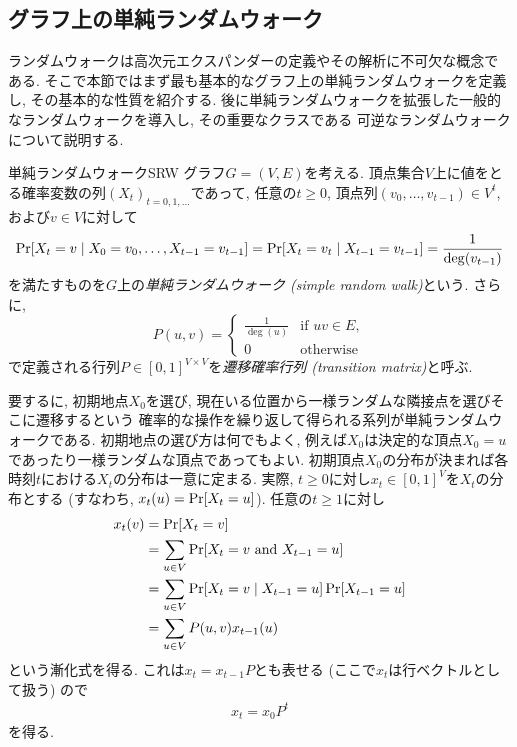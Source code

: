 \subsection{グラフ上の単純ランダムウォーク} \label{sec:SRW}
ランダムウォークは高次元エクスパンダーの定義やその解析に不可欠な概念である.
そこで本節ではまず最も基本的なグラフ上の単純ランダムウォークを定義し, その基本的な性質を紹介する.
後に単純ランダムウォークを拡張した一般的なランダムウォークを導入し, その重要なクラスである
可逆なランダムウォークについて説明する.
%
\begin{definition}{単純ランダムウォーク}{SRW}
  グラフ$G=(V,E)$を考える.
  頂点集合$V$上に値をとる確率変数の列$(X_t)_{t=0,1,\dots}$であって,
  任意の$t\ge 0$, 頂点列$(v_0,\dots,v_{t-1})\in V^t$, および$v\in V$に対して
  \[
    \Pr\sbra*{ X_t = v \condition X_0=v_0,\dots,X_{t-1} = v_{t-1} } = \Pr\sbra*{ X_t = v_t \condition X_{t-1} = v_{t-1}} = \frac{1}{\deg(v_{t-1})}
  \]
  を満たすものを$G$上の\emph{単純ランダムウォーク (simple random walk)}という.
  さらに,
  \[
    P(u,v) = \begin{cases}
      \frac{1}{\deg(u)}	& \text{if }uv\in E,\\
      0 & \text{otherwise}
    \end{cases}
  \]
  で定義される行列$P \in [0,1]^{V\times V}$を\emph{遷移確率行列 (transition matrix)}と呼ぶ.
\end{definition}
%
要するに, 初期地点$X_0$を選び, 現在いる位置から一様ランダムな隣接点を選びそこに遷移するという
確率的な操作を繰り返して得られる系列が単純ランダムウォークである.
初期地点の選び方は何でもよく,
例えば$X_0$は決定的な頂点$X_0=u$であったり一様ランダムな頂点であってもよい.
%
初期頂点$X_0$の分布が決まれば各時刻$t$における$X_t$の分布は一意に定まる.
実際, $t\ge 0$に対し$x_t \in [0,1]^{V}$を$X_t$の分布とする
  (すなわち, $x_t(u) = \Pr\sbra*{X_t = u}$).
任意の$t\ge 1$に対し
\begin{align*}
  x_t(v) &= \Pr\sbra*{X_t = v} \\
    &= \sum_{u\in V}\Pr\sbra*{ X_t = v \tand X_{t-1} = u} \\
    &= \sum_{u\in V}\Pr\sbra*{ X_t = v \condition X_{t-1} = u} \Pr\sbra*{X_{t-1} = u}  \\
    &= \sum_{u\in V} P(u,v) x_{t-1}(u)
\end{align*}
という漸化式を得る.
これは$x_{t} = x_{t-1} P$とも表せる (ここで$x_t$は行ベクトルとして扱う) ので
\begin{align}
  x_t = x_0 P^t \label{eq:x_t SRW}
\end{align}
を得る.

